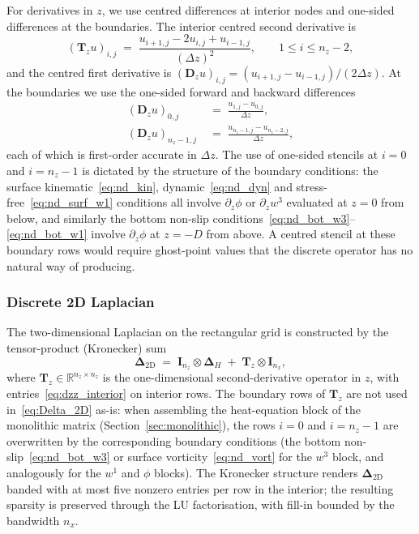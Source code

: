 \documentclass{article}
\begin{document}
For derivatives in $z$, we use centred differences at interior nodes and one-sided differences at the boundaries.
The interior centred second derivative is
\begin{equation}
    (\bm{T}_z u)_{i,j} \;=\; \frac{u_{i+1,j} - 2 u_{i,j} + u_{i-1,j}}{(\Delta z)^2}, \qquad 1 \le i \le n_z - 2, \label{eq:dzz_interior}
\end{equation}
and the centred first derivative is $(\bm{D}_z u)_{i,j} = (u_{i+1,j} - u_{i-1,j})/(2\Delta z)$.
At the boundaries we use the one-sided forward and backward differences
\begin{align}
    (\bm{D}_z u)_{0,j} \;&=\; \frac{u_{1,j} - u_{0,j}}{\Delta z}, \label{eq:dz_bottom} \\
    (\bm{D}_z u)_{n_z-1,j} \;&=\; \frac{u_{n_z-1,j} - u_{n_z-2,j}}{\Delta z}, \label{eq:dz_surface}
\end{align}
each of which is first-order accurate in $\Delta z$.
The use of one-sided stencils at $i = 0$ and $i = n_z - 1$ is dictated by the structure of the boundary conditions: the surface kinematic~\eqref{eq:nd_kin}, dynamic~\eqref{eq:nd_dyn} and stress-free~\eqref{eq:nd_surf_w1} conditions all involve $\partial_{z}\phi$ or $\partial_{z} w^3$ evaluated at $z = 0$ from below, and similarly the bottom non-slip conditions~\eqref{eq:nd_bot_w3}--\eqref{eq:nd_bot_w1} involve $\partial_{z}\phi$ at $z = -D$ from above.
A centred stencil at these boundary rows would require ghost-point values that the discrete operator has no natural way of producing.

\subsubsection{Discrete 2D Laplacian}

The two-dimensional Laplacian on the rectangular grid is constructed by the tensor-product (Kronecker) sum
\begin{equation}
    \bm{\Delta}_{2\mathrm{D}} \;=\; \bm{I}_{n_z} \otimes \bm{\Delta}_H \;+\; \bm{T}_z \otimes \bm{I}_{n_x}, \label{eq:Delta_2D}
\end{equation}
where $\bm{T}_z \in \mathbb{R}^{n_z \times n_z}$ is the one-dimensional second-derivative operator in $z$, with entries~\eqref{eq:dzz_interior} on interior rows.
The boundary rows of $\bm{T}_z$ are not used in~\eqref{eq:Delta_2D} as-is: when assembling the heat-equation block of the monolithic matrix (Section~\ref{sec:monolithic}), the rows $i = 0$ and $i = n_z - 1$ are overwritten by the corresponding boundary conditions (the bottom non-slip~\eqref{eq:nd_bot_w3} or surface vorticity~\eqref{eq:nd_vort} for the $w^3$ block, and analogously for the $w^1$ and $\phi$ blocks).
The Kronecker structure renders $\bm{\Delta}_{2\mathrm{D}}$ banded with at most five nonzero entries per row in the interior; the resulting sparsity is preserved through the LU factorisation, with fill-in bounded by the bandwidth $n_x$.
\color{black}
\end{document}
